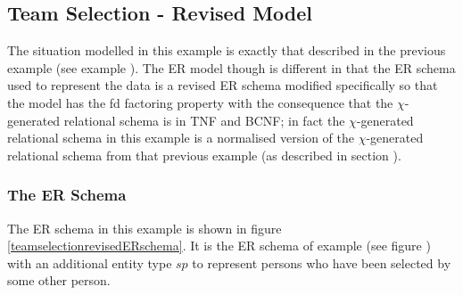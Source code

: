 \subsection{Team Selection - Revised Model}

The situation modelled in this example is exactly that described in the previous example (see example ). 
The ER model though is different in that the ER schema used to represent the data  is a revised ER schema modified specifically so that the model  has the fd factoring property  with the consequence that the $\chi$-generated relational schema is in TNF and BCNF;  in fact the $\chi$-generated relational schema in this example is a normalised version of the $\chi$-generated relational schema from that 
previous example (as described in section ).

\subsubsection{The ER Schema}
The ER schema in this example is shown in figure \ref{teamselectionrevisedERschema}. It is the ER schema of example  (see figure 
) with an additional entity type $sp$ to represent persons who have been selected by some other person.


